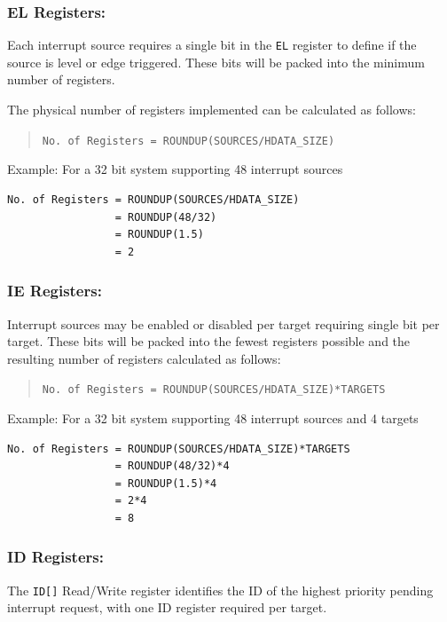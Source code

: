 \subsubsection{EL Registers:}

Each interrupt source requires a single bit in the \texttt{EL} register
to define if the source is level or edge triggered. These bits will be
packed into the minimum number of registers.

The physical number of registers implemented can be calculated as
follows:

\begin{quote}
\texttt{No.\ of\ Registers\ =\ ROUNDUP(SOURCES/HDATA\_SIZE)}
\end{quote}

Example: For a 32 bit system supporting 48 interrupt sources

\begin{verbatim}
No. of Registers = ROUNDUP(SOURCES/HDATA_SIZE)   
                 = ROUNDUP(48/32)
                 = ROUNDUP(1.5)
                 = 2
\end{verbatim}

\subsubsection{IE Registers:}

Interrupt sources may be enabled or disabled per target requiring single
bit per target. These bits will be packed into the fewest registers
possible and the resulting number of registers calculated as follows:

\begin{quote}
\texttt{No.\ of\ Registers\ =\ ROUNDUP(SOURCES/HDATA\_SIZE)*TARGETS}
\end{quote}

Example: For a 32 bit system supporting 48 interrupt sources and 4
targets

\begin{verbatim}
No. of Registers = ROUNDUP(SOURCES/HDATA_SIZE)*TARGETS
                 = ROUNDUP(48/32)*4
                 = ROUNDUP(1.5)*4
                 = 2*4
                 = 8
\end{verbatim}

\subsubsection{ID Registers:}

The \texttt{ID[]} Read/Write
register identifies the ID of the highest priority pending interrupt
request, with one ID register required per target.

